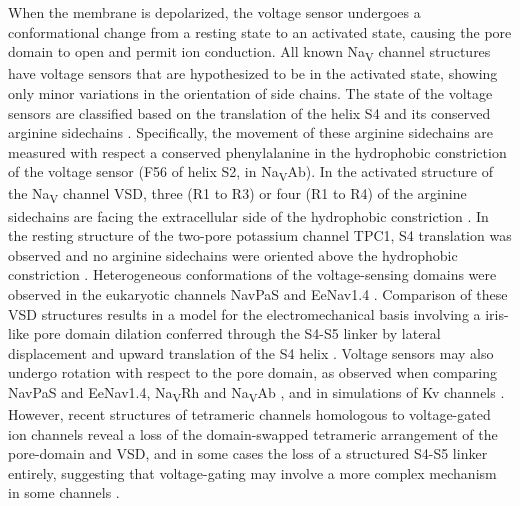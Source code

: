 \begin{refsection}
When the membrane is depolarized, the voltage sensor undergoes a conformational change from a resting state to an activated state, causing the pore domain to open and permit ion conduction. All known Na\textsubscript{V} channel structures have voltage sensors that are hypothesized to be in the activated state, showing only minor variations in the orientation of side chains. The state of the voltage sensors are classified based on the translation of the helix S4 and its conserved arginine sidechains \cite{Vargas:2012ek}. Specifically, the movement of these arginine sidechains are measured with respect a conserved phenylalanine in the hydrophobic constriction of the voltage sensor (F56 of helix S2, in Na\textsubscript{V}Ab). In the activated structure of the Na\textsubscript{V} channel VSD, three (R1 to R3) or four (R1 to R4) of the arginine sidechains are facing the extracellular side of the hydrophobic constriction \cite{Payandeh:2012ib,Zhang:2013bz}. In the resting structure of the two-pore potassium channel TPC1, S4 translation was observed and no arginine sidechains were oriented above the hydrophobic constriction \cite{Guo:2016jb}. Heterogeneous conformations of the voltage-sensing domains were observed in the eukaryotic channels NavPaS and EeNav1.4 \cite{Yan:2017kd}. Comparison of these VSD structures results in a model for the electromechanical basis involving a iris-like pore domain dilation conferred through the S4-S5 linker by lateral displacement and upward translation of the S4 helix \cite{Yan:2017kd,Shen:2017df}. Voltage sensors may also undergo rotation with respect to the pore domain, as observed when comparing NavPaS and EeNav1.4, Na\textsubscript{V}Rh and Na\textsubscript{V}Ab \cite{Payandeh:2015hz,Zhang:2013jf}, and in simulations of Kv channels \cite{Jensen:2012ee}. However, recent structures of tetrameric channels homologous to voltage-gated ion channels reveal a loss of the domain-swapped tetrameric arrangement of the pore-domain and VSD, and in some cases the loss of a structured S4-S5 linker entirely, suggesting that voltage-gating may involve a more complex mechanism in some channels \cite{Wang:2017kg,Whicher:2016ix,Lee:2017ix,Hite:2017kh,Li:2017ex,Tomczak:2017gf}. 


\end{refsection}

